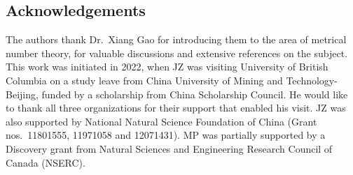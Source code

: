 \documentclass[12pt, twoside]{article}
\theoremstyle{definition}
\numberwithin{equation}{section}
\begin{document}
\subsection{Acknowledgements} 
The authors thank Dr.~Xiang Gao for introducing them to the area of metrical number theory, for valuable discussions and extensive references on the subject. This work was initiated in 2022, when JZ was visiting University of British Columbia on a study leave from China University of Mining and Technology-Beijing, funded by a scholarship from China Scholarship Council. He would like to thank all three organizations for their support that enabled his visit. JZ was also supported by National Natural Science Foundation of China  (Grant nos.~11801555, 11971058 and 12071431). MP was partially supported by a Discovery grant from Natural Sciences and Engineering Research Council of Canada (NSERC). 
\end{document}
